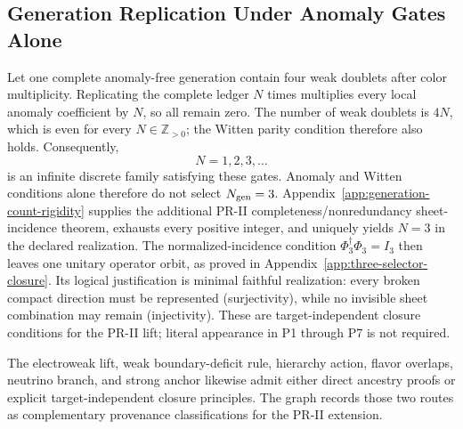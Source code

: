 \subsection{Generation Replication Under Anomaly Gates Alone}

Let one complete anomaly-free generation contain four weak doublets after color multiplicity.  Replicating the complete ledger $N$ times multiplies every local anomaly coefficient by $N$, so all remain zero.  The number of weak doublets is $4N$, which is even for every $N\in\mathbb Z_{>0}$; the
Witten \cite{Witten_1982} parity condition therefore also holds.  Consequently,
\begin{equation}
 N=1,2,3,\ldots
\end{equation}
is an infinite discrete family satisfying these gates.  Anomaly and Witten conditions alone therefore do not select $N_{\rm gen}=3$. Appendix~\ref{app:generation-count-rigidity} supplies the additional PR-II completeness/nonredundancy sheet-incidence theorem, exhausts every positive integer, and uniquely yields $N=3$ in the declared realization.  The normalized-incidence condition $\Phi_3^\dagger\Phi_3=I_3$ then leaves one unitary operator orbit, as proved in
Appendix~\ref{app:three-selector-closure}.  Its logical justification is minimal faithful realization: every broken compact direction must be represented (surjectivity), while no invisible sheet combination may remain (injectivity).  These are target-independent closure conditions for the
PR-II lift; literal appearance in P1 through P7 is not required.

The electroweak lift, weak boundary-deficit rule, hierarchy action, flavor overlaps, neutrino branch, and strong anchor likewise admit either direct ancestry proofs or explicit target-independent closure principles.  The graph records those two routes as complementary provenance classifications for the
PR-II extension.
